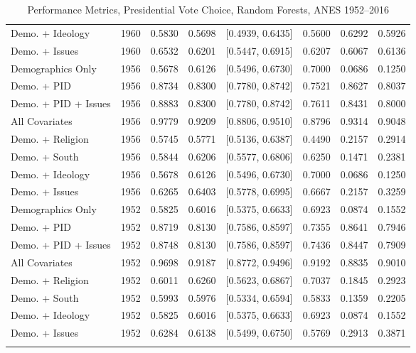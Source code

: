 \begin{longtable}{lrrrlrrr}
  Demo. + Ideology & 1960 & 0.5830 & 0.5698 & [0.4939, 0.6435] & 0.5600 & 0.6292 & 0.5926 \\ 
  Demo. + Issues & 1960 & 0.6532 & 0.6201 & [0.5447, 0.6915] & 0.6207 & 0.6067 & 0.6136 \\ 
  Demographics Only & 1956 & 0.5678 & 0.6126 & [0.5496, 0.6730] & 0.7000 & 0.0686 & 0.1250 \\ 
  Demo. + PID & 1956 & 0.8734 & 0.8300 & [0.7780, 0.8742] & 0.7521 & 0.8627 & 0.8037 \\ 
  Demo. + PID + Issues & 1956 & 0.8883 & 0.8300 & [0.7780, 0.8742] & 0.7611 & 0.8431 & 0.8000 \\ 
  All Covariates & 1956 & 0.9779 & 0.9209 & [0.8806, 0.9510] & 0.8796 & 0.9314 & 0.9048 \\ 
  Demo. + Religion & 1956 & 0.5745 & 0.5771 & [0.5136, 0.6387] & 0.4490 & 0.2157 & 0.2914 \\ 
  Demo. + South & 1956 & 0.5844 & 0.6206 & [0.5577, 0.6806] & 0.6250 & 0.1471 & 0.2381 \\ 
  Demo. + Ideology & 1956 & 0.5678 & 0.6126 & [0.5496, 0.6730] & 0.7000 & 0.0686 & 0.1250 \\ 
  Demo. + Issues & 1956 & 0.6265 & 0.6403 & [0.5778, 0.6995] & 0.6667 & 0.2157 & 0.3259 \\ 
  Demographics Only & 1952 & 0.5825 & 0.6016 & [0.5375, 0.6633] & 0.6923 & 0.0874 & 0.1552 \\ 
  Demo. + PID & 1952 & 0.8719 & 0.8130 & [0.7586, 0.8597] & 0.7355 & 0.8641 & 0.7946 \\ 
  Demo. + PID + Issues & 1952 & 0.8748 & 0.8130 & [0.7586, 0.8597] & 0.7436 & 0.8447 & 0.7909 \\ 
  All Covariates & 1952 & 0.9698 & 0.9187 & [0.8772, 0.9496] & 0.9192 & 0.8835 & 0.9010 \\ 
  Demo. + Religion & 1952 & 0.6011 & 0.6260 & [0.5623, 0.6867] & 0.7037 & 0.1845 & 0.2923 \\ 
  Demo. + South & 1952 & 0.5993 & 0.5976 & [0.5334, 0.6594] & 0.5833 & 0.1359 & 0.2205 \\ 
  Demo. + Ideology & 1952 & 0.5825 & 0.6016 & [0.5375, 0.6633] & 0.6923 & 0.0874 & 0.1552 \\ 
  Demo. + Issues & 1952 & 0.6284 & 0.6138 & [0.5499, 0.6750] & 0.5769 & 0.2913 & 0.3871 \\ 
   \bottomrule
\caption{Performance Metrics, Presidential Vote Choice, Random Forests, ANES 1952--2016} 
\label{tab:ANES_prezvote_rf}
\end{longtable}
